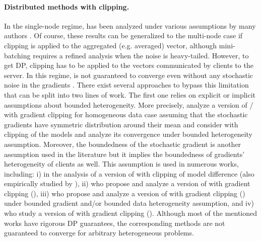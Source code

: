 \documentclass[a4paper,11pt]{article}
\begin{document}
\paragraph{Distributed methods with clipping.} In  the single-node regime,  has been analyzed under various assumptions by many authors \citep{zhang2020why, zhang2020adaptive, zhang2020improved, gorbunov2020stochastic, cutkosky2021high, sadiev2023high, liu2023high}. Of course, these results can be generalized to the multi-node case if clipping is applied to the aggregated (e.g. averaged) vector, although mini-batching requires a refined analysis when the noise is heavy-tailed\citep{kornilov2024accelerated}. However, to get DP, clipping has to be applied to the vectors communicated by clients to the server. In this regime,  is not guaranteed to converge even without any stochastic noise in the gradients \citep{chen2020understanding, khirirat2023clip21}. There exist several approaches to bypass this limitation that can be split into two lines of work. The first one relies on explicit or implicit assumptions about bounded heterogeneity. More precisely, \citet{liu2022communication} analyze a version of / \citep{mangasarian1995parallel, mcmahan2017communication} with gradient clipping for homogeneous data case assuming that the stochastic gradients have symmetric distribution around their mean and \citet{wei2020federated} consider  with clipping of the models and analyze its convergence under bounded heterogeneity assumption. Moreover, the boundedness of the stochastic gradient is another assumption used in the literature but it implies the boundedness of gradients' heterogeneity of clients as well. This assumption is used in numerous works, including: i) \citet{zhang2022understanding} in the analysis of a version of  with clipping of model difference (also empirically studied by \citet{geyer2017differentially}), ii) \citet{noble2022differentially} who propose and analyze a version of  \citep{karimireddy2020scaffold} with gradient clipping (), iii) \citet{li2023convergence} who propose and analyze a version of  \citep{li2021page} with gradient clipping () under bounded gradient and/or bounded data heterogeneity assumption, and iv) \citet{allouah2024privacy} who study a version of  \citep{nedic2009distributed} with gradient clipping (). Although most of the mentioned works have rigorous DP guarantees, the corresponding methods are not guaranteed to converge for arbitrary heterogeneous problems. 
\end{document}
